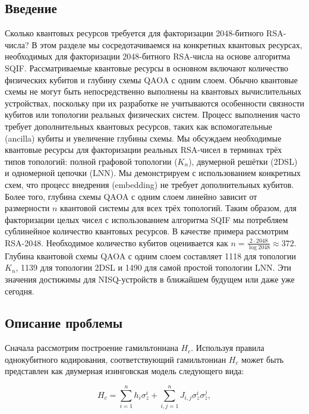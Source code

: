 
\subsection*{Введение}

Сколько квантовых ресурсов требуется для факторизации 2048-битного RSA-числа? В
этом разделе мы сосредотачиваемся на конкретных квантовых ресурсах, необходимых
для факторизации 2048-битного RSA-числа на основе алгоритма SQIF.
Рассматриваемые квантовые ресурсы в основном включают количество физических
кубитов и глубину схемы QAOA с одним слоем. Обычно квантовые схемы не могут
быть непосредственно выполнены на квантовых вычислительных устройствах,
поскольку при их разработке не учитываются особенности связности кубитов или
топологии реальных физических систем. Процесс выполнения часто требует
дополнительных квантовых ресурсов, таких как вспомогательные (ancilla) кубиты и
увеличение глубины схемы. Мы обсуждаем необходимые квантовые ресурсы для
факторизации реальных RSA-чисел в терминах трёх типов топологий: полной
графовой топологии ($K_n$), двумерной решётки (2DSL) и одномерной цепочки
(LNN). Мы демонстрируем с использованием конкретных схем, что процесс внедрения
(embedding) не требует дополнительных кубитов. Более того, глубина схемы QAOA с
одним слоем линейно зависит от размерности $n$ квантовой системы для всех трёх
топологий. Таким образом, для факторизации целых чисел с использованием
алгоритма SQIF мы потребляем сублинейное количество квантовых ресурсов. В
качестве примера рассмотрим RSA-2048. Необходимое количество кубитов
оценивается как $n = \frac{2 \cdot 2048}{\log 2048} \approx 372$. Глубина
квантовой схемы QAOA с одним слоем составляет 1118 для топологии $K_n$, 1139
для топологии 2DSL и 1490 для самой простой топологии LNN. Эти значения
достижимы для NISQ-устройств в ближайшем будущем или даже уже сегодня.

\subsection*{Описание проблемы}

Сначала рассмотрим построение гамильтониана $H_c$. Используя правила
однокубитного кодирования, соответствующий гамильтониан $H_c$ может быть
представлен как двумерная изинговская модель следующего вида:

\begin{equation}
H_c = \sum_{i=1}^{n} h_i \sigma_z^i + \sum_{i,j=1}^{n} J_{i,j} \sigma_z^i \sigma_z^j,
\end{equation}

